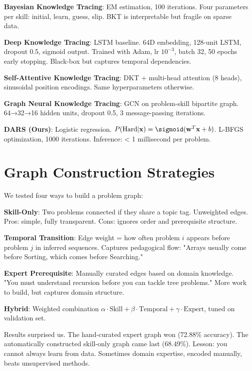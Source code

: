 \documentclass[conference]{IEEEtran}
\begin{document}
\textbf{Bayesian Knowledge Tracing}: EM estimation, 100 iterations. Four parameters per skill: initial, learn, guess, slip. BKT is interpretable but fragile on sparse data.

\textbf{Deep Knowledge Tracing}: LSTM baseline. 64D embedding, 128-unit LSTM, dropout 0.5, sigmoid output. Trained with Adam, lr $10^{-3}$, batch 32, 50 epochs early stopping. Black-box but captures temporal dependencies.

\textbf{Self-Attentive Knowledge Tracing}: DKT + multi-head attention (8 heads), sinusoidal position encodings. Same hyperparameters otherwise.

\textbf{Graph Neural Knowledge Tracing}: GCN on problem-skill bipartite graph. 64→32→16 hidden units, dropout 0.5, 3 message-passing iterations.

\textbf{DARS (Ours)}: Logistic regression. $P(\text{Hard} | \mathbf{x}) = \sigmoid(\mathbf{w}^T \mathbf{x} + b)$. L-BFGS optimization, 1000 iterations. Inference: < 1 millisecond per problem.

\section{Graph Construction Strategies}

We tested four ways to build a problem graph:

\textbf{Skill-Only}: Two problems connected if they share a topic tag. Unweighted edges. Pros: simple, fully transparent. Cons: ignores order and prerequisite structure.

\textbf{Temporal Transition}: Edge weight = how often problem $i$ appears before problem $j$ in inferred sequences. Captures pedagogical flow: "Arrays usually come before Sorting, which comes before Searching."

\textbf{Expert Prerequisite}: Manually curated edges based on domain knowledge. "You must understand recursion before you can tackle tree problems." More work to build, but captures domain structure.

\textbf{Hybrid}: Weighted combination $\alpha \cdot \text{Skill} + \beta \cdot \text{Temporal} + \gamma \cdot \text{Expert}$, tuned on validation set.

Results surprised us. The hand-curated expert graph won (72.88\% accuracy). The automatically constructed skill-only graph came last (68.49\%). Lesson: you cannot always learn from data. Sometimes domain expertise, encoded manually, beats unsupervised methods.
\end{document}
